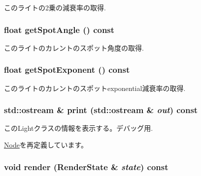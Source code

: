 このライトの2乗の減衰率の取得. \hypertarget{classm3g_1_1Light_1117f914d754fe74c090dc97bde905eb}{
\subsubsection[{getSpotAngle}]{\setlength{\rightskip}{0pt plus 5cm}float getSpotAngle () const}}
\label{classm3g_1_1Light_1117f914d754fe74c090dc97bde905eb}


このライトのカレントのスポット角度の取得. \hypertarget{classm3g_1_1Light_a359fee191741efb7e576616a59a76f7}{
\subsubsection[{getSpotExponent}]{\setlength{\rightskip}{0pt plus 5cm}float getSpotExponent () const}}
\label{classm3g_1_1Light_a359fee191741efb7e576616a59a76f7}


このライトのカレントのスポットexponential減衰率の取得. \hypertarget{classm3g_1_1Light_6fea17fa1532df3794f8cb39cb4f911f}{
\subsubsection[{print}]{\setlength{\rightskip}{0pt plus 5cm}std::ostream \& print (std::ostream \& {\em out}) const}}
\label{classm3g_1_1Light_6fea17fa1532df3794f8cb39cb4f911f}


このLightクラスの情報を表示する。デバッグ用. 

\hyperlink{classm3g_1_1Node_6fea17fa1532df3794f8cb39cb4f911f}{Node}を再定義しています。\hypertarget{classm3g_1_1Light_8babc8a79b78615da51161e94029eea9}{
\subsubsection[{render}]{\setlength{\rightskip}{0pt plus 5cm}void render ({\bf RenderState} \& {\em state}) const}}
\label{classm3g_1_1Light_8babc8a79b78615da51161e94029eea9}


